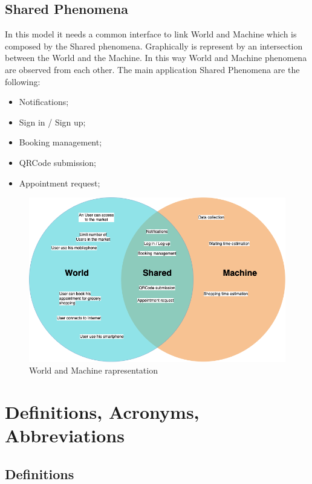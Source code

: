 \subsection{Shared Phenomena} 
In this model it needs a common interface to link World and Machine which is composed by the Shared phenomena. Graphically is represent by an intersection between the World and the Machine. In this way World and Machine phenomena are observed from each other.  
The main application Shared Phenomena are the following:

\begin{itemize}
\item Notifications;
\item Sign in / Sign up;
\item Booking management;
\item QRCode submission;
\item Appointment request;
\end{itemize}

\begin{figure}[H]
  \caption{World and Machine rapresentation}
  \label{fig:Reservation}
  \centering
  \includegraphics[scale = 0.38]{diagrams/VENN.png}
\end{figure}


\section{Definitions, Acronyms, Abbreviations}
\subsection{Definitions}

